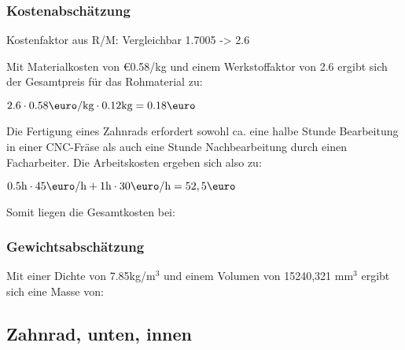 \documentclass[10pt, a4paper]{article}
\begin{document}
\subsubsection{Kostenabschätzung}
\begin{center}
  Kostenfaktor aus R/M: Vergleichbar 1.7005 -> 2.6
\end{center}
Mit Materialkosten von \euro0.58/kg und einem Werkstoffaktor von 2.6 ergibt sich der Gesamtpreis für das Rohmaterial zu: 
\begin{center}
    $2.6 \cdot 0.58\text{\euro/kg} \cdot 0.12\text{kg} = 0.18\text{\euro}$
\end{center}
Die Fertigung eines Zahnrads erfordert sowohl ca. eine halbe Stunde Bearbeitung in einer CNC-Fräse als auch eine Stunde Nachbearbeitung durch einen Facharbeiter. Die Arbeitskosten ergeben sich also zu:
\begin{center}
  $0.5\text{h} \cdot 45\text{\euro/h} + 1\text{h} \cdot 30\text{\euro/h} = 52,5\text{\euro}$
\end{center}
Somit liegen die Gesamtkosten bei:
\begin{flushright}
\end{flushright}
\subsubsection{Gewichtsabschätzung}
Mit einer Dichte von 7.85kg/m$^3$ und einem Volumen von 15240,321 mm$^3$ ergibt sich eine Masse von:
\begin{flushright}
\end{flushright}

\newpage
\subsection{Zahnrad, unten, innen}
\begin{figure}[h]
  \centering
  \vspace{-10pt}
\end{figure}
\end{document}
